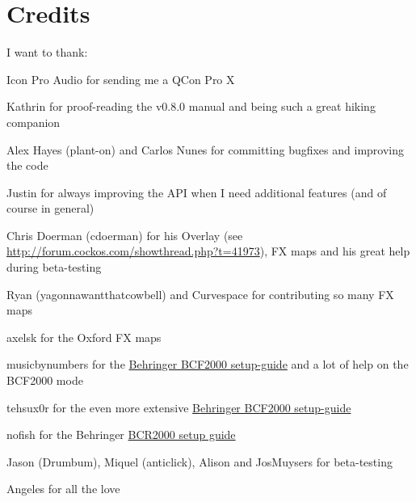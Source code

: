 \section{Credits}\label{credits}

I want to thank:
\begin{compactitem}
\item Icon Pro Audio for sending me a QCon Pro X
\item Kathrin for proof-reading the v0.8.0 manual and being such a great
  hiking companion
\item Alex Hayes (plant-on) and Carlos Nunes for committing bugfixes
  and improving the code
\item Justin for always improving the \reaper API when I need
  additional features (and of course \reaper in general)
\item Chris Doerman (cdoerman) for his Overlay (see
  \url{http://forum.cockos.com/showthread.php?t=41973}), FX maps and his great help during
  beta-testing
\item Ryan (yagonnawantthatcowbell) and Curvespace for contributing so
  many FX maps
\item axelsk for the Oxford FX maps
\item musicbynumbers for the
  \href{http://forum.cockos.com/showpost.php?p=473466&postcount=127}{Behringer
    BCF2000 setup-guide} and a lot of help on the BCF2000 mode
\item tehsux0r for the even more extensive
  \href{http://forum.cockos.com/showthread.php?t=117909}{Behringer
    BCF2000 setup-guide}
\item nofish for the Behringer
  \href{http://forum.cockos.com/showthread.php?t=60110}{BCR2000
    setup guide}
\item Jason (Drumbum), Miquel (anticlick), Alison and JosMuysers for
  beta-testing
\item Angeles for all the love
\end{compactitem}
